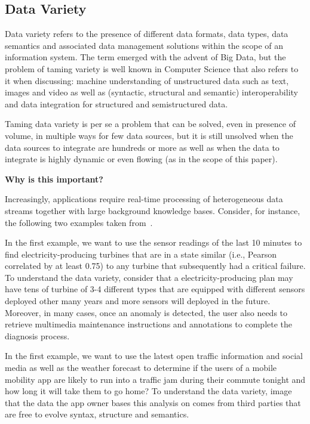 \subsection{Data Variety}

Data variety refers to the presence of different data formats, data types, data semantics and associated data management solutions within the scope of an information system. The term emerged with the advent of Big Data, but the problem of taming variety is well known in Computer Science that also refers to it when discussing: machine understanding of unstructured data such as text, images and video as well as (syntactic, structural and semantic) interoperability and data integration for structured and semistructured data. 

Taming data variety is per se a problem that can be solved, even in presence of volume, in multiple ways for few data sources, but it is still unsolved when the data sources to integrate are hundreds or more as well as when the data to integrate is highly dynamic or even flowing (as in the scope of this paper).

\textbf{Why is this important?}

Increasingly, applications require real-time processing of heterogeneous data streams together with large background knowledge bases. Consider, for instance, the following two examples taken from~\cite{DellAglioDataScience2017}. 

In the first example, we want to use the sensor readings of the last 10 minutes to find electricity-producing turbines that are in a state similar (i.e., Pearson correlated by at least 0.75) to any turbine that subsequently had a critical failure. To understand the data variety, consider that a electricity-producing plan may have tens of turbine of 3-4 different types that are equipped with different sensors deployed other many years and more sensors will deployed in the future. Moreover, in many cases, once an anomaly is detected, the user also needs to retrieve multimedia maintenance instructions and annotations to complete the diagnosis process. 

In the first example, we want to use the latest open traffic information and social media as well as the weather forecast to determine if the users of a mobile mobility app are likely to run into a traffic jam during their commute tonight and how long it will take them to go home? To understand the data variety, image that the data the app owner bases this analysis on comes from third parties that are free to evolve syntax, structure and semantics.


